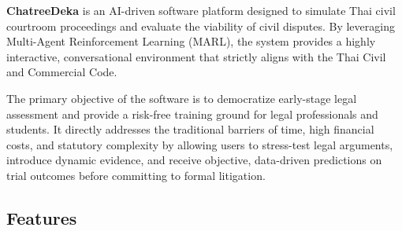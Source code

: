 \textbf{ChatreeDeka} is an AI-driven software platform designed to simulate Thai civil courtroom proceedings and evaluate the viability of civil disputes. By leveraging Multi-Agent Reinforcement Learning (MARL), the system provides a highly interactive, conversational environment that strictly aligns with the Thai Civil and Commercial Code. 

The primary objective of the software is to democratize early-stage legal assessment and provide a risk-free training ground for legal professionals and students. It directly addresses the traditional barriers of time, high financial costs, and statutory complexity by allowing users to stress-test legal arguments, introduce dynamic evidence, and receive objective, data-driven predictions on trial outcomes before committing to formal litigation.

\subsection{Features}
\label{subsection:features}

